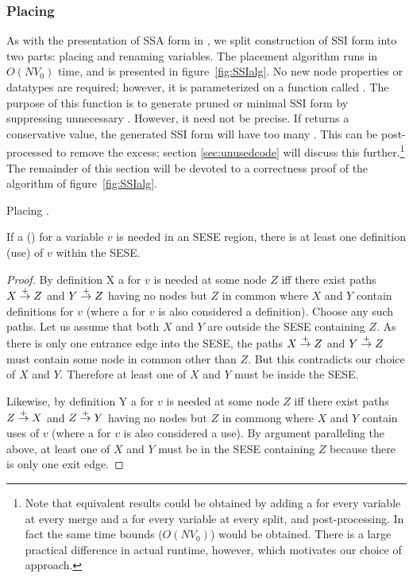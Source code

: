 \documentclass[12pt,titlepage,twoside]{article}
\begin{document}
\subsubsection{Placing }
As with the presentation of SSA form in \cite{cytron91:ssa}, we split
construction of SSI form into two parts: placing 
and renaming variables.  The placement algorithm runs in $O(N V_0)$
time, and is presented in figure~\vref{fig:SSIalg}.  No new node
properties or datatypes are required; however, it is parameterized on
a function called .  The purpose of this function is
to generate pruned or minimal SSI form by suppressing unnecessary
.  However, it need not be precise.  If
 returns a conservative value, the generated SSI
form will have too many .  This can be
post-processed to remove the excess; section \ref{sec:unusedcode} will
discuss this further.\footnote{Note that equivalent results could be
obtained by adding a \phifunction{} for every variable at every merge
and a \sigfunction{} for every variable at every split, and
post-processing.  In fact the same time bounds ($O(N V_0)$) would be
obtained.  There is a large practical difference in actual runtime,
however, which motivates our choice of approach.}  The remainder of
this section will be devoted to a correctness proof of the algorithm
of figure~\ref{fig:SSIalg}.

\begin{myalgorithm}\small

\caption{Placing .}\label{fig:SSIalg}
\end{myalgorithm}

\begin{lemma}
If a \phifunction{} (\sigfunction{}) for a variable $v$ is needed in
an SESE region, there is at least one definition (use) of $v$ within
the SESE.
\end{lemma}
\begin{proof}
By definition X a \phifunction{} for $v$ is needed at some node $Z$
iff there exist paths $X \stackrel{+}{\rightarrow} Z$ and $Y \stackrel{+}{\rightarrow} Z$ having no
nodes but $Z$ in common where $X$ and $Y$ contain definitions for $v$
(where a \phisigfunction[or] for $v$ is also considered a definition).
Choose any such paths.  Let us assume that both $X$ and $Y$ are
outside the SESE containing $Z$.  As there is only one entrance edge
into the SESE, the paths $X \stackrel{+}{\rightarrow} Z$ and $Y \stackrel{+}{\rightarrow} Z$ must
contain some node in common other than $Z$.  But this contradicts our
choice of $X$ and $Y$.  Therefore at least one of $X$ and $Y$ must be
inside the SESE.

Likewise, by definition Y a \sigfunction{} for $v$ is needed at some
node $Z$ iff there exist paths $Z \stackrel{+}{\rightarrow} X$ and $Z \stackrel{+}{\rightarrow} Y$
having no nodes but $Z$ in commong where $X$ and $Y$ contain uses of
$v$ (where a \phisigfunction[or] for $v$ is also considered a use).
By argument paralleling the above, at least one of $X$ and $Y$ must be
in the SESE containing $Z$ because there is only one exit edge.
\end{proof}
\end{document}
